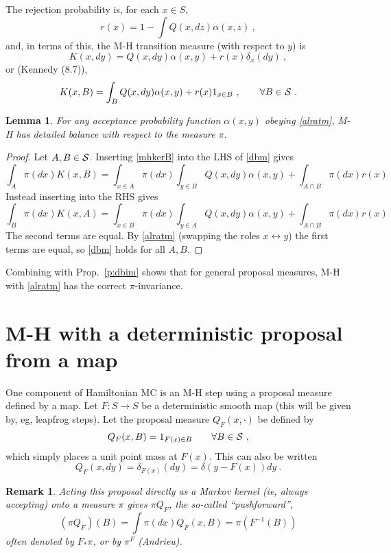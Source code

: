 \documentclass[10pt]{article}
\newcommand{\be}{\begin{equation}}
\newcommand{\ee}{\end{equation}}
\newtheorem{lem}[thm]{Lemma}
\newtheorem{rmk}[thm]{Remark}
\newcommand{\al}{\alpha}
\begin{document}
The rejection probability is, for each $x\in S$,
\be
r(x) = 1 - \int Q(x,dz) \al(x,z)~,
\label{rejm}
\ee
and, in terms of this, the M-H transition measure (with respect to $y$) is
\be
K(x,dy) = Q(x,dy) \al(x,y) + r(x) \delta_x(dy)~,
\label{mhkerm}
\ee
or (Kennedy (8.7)),
\be
K(x,B) = \int_B Q(x,dy) \al(x,y) + r(x) 1_{x\in B}~, \qquad \forall B \in \cal S
~.
\label{mhkerB}
\ee

\begin{lem}
  For any acceptance probability function $\al(x,y)$ obeying \eqref{alratm},
  M-H has detailed balance with respect to the measure $\pi$.
\end{lem}
\begin{proof}
  Let $A,B\in \cal S$.
  Inserting \eqref{mhkerB} into the LHS of \eqref{dbm}
  gives
  $$
  \int_A \pi(dx) K(x,B) = \int_{x\in A} \pi(dx) \int_{y\in B} Q(x,dy) \al(x,y)
  + \int_{A\cap B} \pi(dx) r(x)
  $$
  Instead inserting into the RHS gives
  $$
  \int_B \pi(dx) K(x,A) = \int_{x\in B} \pi(dx) \int_{y\in A} Q(x,dy) \al(x,y)
  + \int_{A\cap B} \pi(dx) r(x)
  $$
  The second terms are equal.
  By \eqref{alratm} (swapping the roles $x\leftrightarrow y$) the first terms are equal,
  so \eqref{dbm} holds for all $A,B$.
\end{proof}

Combining with Prop.~\ref{p:dbim} shows that for general proposal measures,
M-H with \eqref{alratm} has the correct $\pi$-invariance.


\section{M-H with a deterministic proposal from a map}

One component of Hamiltonian MC is an M-H step using a proposal measure defined by a map.
Let $F: S\to S$ be a deterministic smooth map (this will be given by, eg,
leapfrog steps).
Let the proposal measure $Q_F(x,\cdot)$ be defined by
$$
Q_F(x,B) = 1_{F(x)\in B} \qquad \forall B \in \cal S~,
$$
which simply places a unit point mass at $F(x)$.
This can also be written
$$
Q_F(x,dy) = \delta_{F(x)}(dy) = \delta(y - F(x)) dy ~.
$$
\begin{rmk} Acting this proposal directly as a Markov kernel (ie, always accepting) onto a measure $\pi$ gives $\pi Q_F$, the so-called ``pushforward'',
$$
(\pi Q_F)(B) = \int \pi(dx) Q_F(x,B) = \pi(F^{-1}(B))
$$
often denoted by $F_\ast \pi$, or by $\pi^F$ (Andrieu).
\end{rmk}
\end{document}
